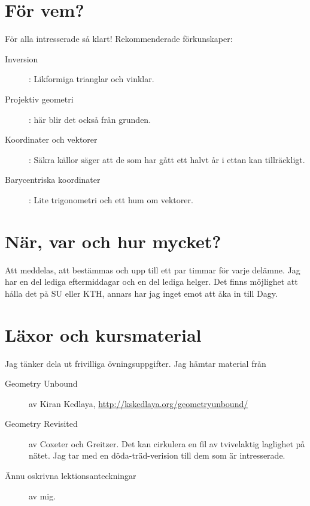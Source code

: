 \section{För vem?}
För alla intresserade så klart! Rekommenderade förkunskaper:
 
\begin{description}
\item[Inversion]: Likformiga trianglar och vinklar.

\item[Projektiv geometri]: här blir det också från grunden.

\item[Koordinater och vektorer]: Säkra källor säger att de som har gått ett halvt år i ettan
    kan tillräckligt.

\item[Barycentriska koordinater]: Lite trigonometri och ett hum om vektorer.

\end{description}
\section{När, var och hur mycket?}
    Att meddelas, att bestämmas och upp till ett par timmar för varje delämne.
    Jag har en del lediga eftermiddagar och en del lediga helger. Det finns möjlighet att hålla det på SU eller KTH,
    annars har jag inget emot att åka in till Dagy.

\section{Läxor och kursmaterial}
    Jag tänker dela ut frivilliga övningsuppgifter. Jag hämtar material från
    \begin{description}
    \item[Geometry Unbound] av Kiran Kedlaya, \url{http://kskedlaya.org/geometryunbound/}
    \item[Geometry Revisited] av Coxeter och Greitzer. Det kan cirkulera en fil 
    av tvivelaktig laglighet på nätet. Jag tar med en döda-träd-verision till dem som
    är intresserade.
    \item[Ännu oskrivna lektionsanteckningar] av mig.
    \end{description}



